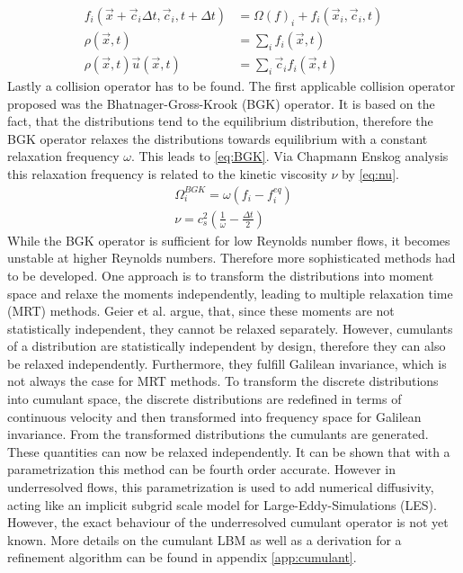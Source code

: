 \begin{align}
	f_i(\vec{x} + \vec{c}_i \Delta t, \vec{c}_i, t+\Delta t ) &= \Omega(f)_i + f_i(\vec{x}_i, \vec{c}_i, t) \label{eq:LBE} \\
	\rho(\vec{x}, t) &= \sum_i f_i(\vec{x}, t) \label{eq:density_d} \\
	\rho(\vec{x}, t) \vec{u}(\vec{x}, t) &= \sum_i \vec{c}_i f_i(\vec{x}, t) \label{eq:vel_d}
\end{align}
Lastly a collision operator has to be found. The first applicable collision operator proposed was the Bhatnager-Gross-Krook (BGK) operator. It is based on the fact, that the distributions tend to the equilibrium distribution, therefore the BGK operator relaxes the distributions towards equilibrium with a constant relaxation frequency $\omega$. This leads to \eqref{eq:BGK}. Via Chapmann Enskog analysis this relaxation frequency is related to the kinetic viscosity $\nu$ by \eqref{eq:nu}. \cite[p. 98-100, 112]{kruger_lattice_2017}
\begin{align}
	\Omega^{BGK}_i = \omega\left(f_i - f_i^{eq} \right) \label{eq:BGK} \\
	\nu = c_s^2\left(\frac{1}{\omega} - \frac{\Delta t }{2} \right) \label{eq:nu}
\end{align}
While the BGK operator is sufficient for low Reynolds number flows, it becomes unstable at higher Reynolds numbers. Therefore more sophisticated methods had to be developed. One approach is to transform the distributions into moment space and relaxe the moments independently, leading to multiple relaxation time (MRT) methods. Geier et al. argue, that, since these moments are not statistically independent, they cannot be relaxed separately. However, cumulants of a distribution are statistically independent by design, therefore they can also be relaxed independently. Furthermore, they fulfill Galilean invariance, which is not always the case for MRT methods. To transform the discrete distributions into cumulant space, the discrete distributions are redefined in terms of continuous velocity and then transformed into frequency space for Galilean invariance. From the transformed distributions the cumulants are generated. These quantities can now be relaxed independently. It can be shown that with a parametrization this method can be fourth order accurate\cite{geier_fourth_2018}. However in underresolved flows, this parametrization is used to add numerical diffusivity, acting like an implicit subgrid scale model for Large-Eddy-Simulations (LES). However, the exact behaviour of the underresolved cumulant operator is not yet known. More details on the cumulant LBM as well as a derivation for a refinement algorithm can be found in appendix \ref{app:cumulant}. \\
